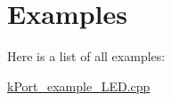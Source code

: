 \section{Examples}
Here is a list of all examples\+:\begin{DoxyCompactItemize}
\item 
\hyperlink{kPort_example_LED_8cpp-example}{k\+Port\+\_\+example\+\_\+\+L\+E\+D.\+cpp}
\end{DoxyCompactItemize}
